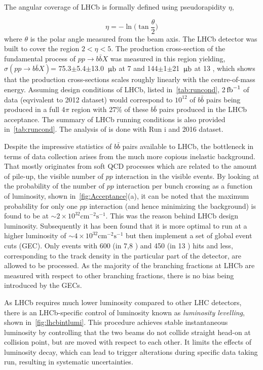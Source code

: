 The angular coverage of \Gls{LHCb} is formally defined using pseudorapidity $\eta$, 

\begin{equation}
	\eta = -\ln \Big(\tan\frac{\theta}{2}\Big)
\end{equation}	
where $\theta$ is the polar angle measured from the beam axis. The \Gls{LHCb} detector was built to cover the region $2<\eta<5$. The production cross-section of the fundamental process of $pp\rightarrow b\bar{b}X$ was measured in this region yielding, $\sigma (pp\rightarrow b\bar{b}X)$= 75.3$\pm$5.4$\pm$13.0 ${\rm \,\upmu b}$ at 7 \tev \cite{LHCb-PAPER-2010-002} and 144$\pm$1$\pm$21 ${\rm \,\upmu b}$ at 13 \tev \cite{LHCb-PAPER-2016-031}, which shows that the production cross-sections scales roughly linearly with the centre-of-mass energy. Assuming design conditions of \gls{LHCb}, listed in~\autoref{tab:runcond}, 2$\mbox{\,fb}^{-1}$ of data (eqvivalent to 2012 dataset) would correspond to $10^{12}$ of $b\bar{b}$ pairs being produced in a full 4$\pi$ region with 27\% of these $b\bar{b}$ pairs produced in the \gls{LHCb} acceptance. The summary of \gls{LHCb} running conditions is also provided in~\autoref{tab:runcond}. The analysis of \Bmumumu is done with Run \Rn{1} and 2016 dataset. 

Despite the impressive statistics of $b\bar{b}$ pairs available to \Gls{LHCb}, the bottleneck in terms of data collection arises from the much more copious inelastic background. That mostly originates from soft \gls{QCD} processes which are related to the amount of pile-up, the visible number of $pp$ interaction in the visible events. By looking at the probability of the number of $pp$ interaction per bunch crossing as a function of luminosity, shown in~\autoref{fig:Acceptance}(a), it can be noted that the maximum probability for only one $pp$ interaction (and hence minimizing the background) is found to be at $\sim 2 \times10^{32} \mathrm{cm^{-2} s^{-1}}$.  This was the reason behind \gls{LHCb} design luminosity. Subsequently it has been found that it is more optimal to run at a higher luminosity of $\sim 4 \times10^{32} \mathrm{cm^{-2} s^{-1}}$ but then implement a set of global event cuts (GEC). Only events with 600 (in 7,8 \tev) and 450 (in 13 \tev) hits and less, corresponding to the track density in the particular part of the detector, are allowed to be processed.
As the majority of the branching fractions at \gls{LHCb} are measured with respect to other branching fractions, there is no bias being introduced by the GECs. 

As \Gls{LHCb} requires much lower luminosity compared to other \gls{LHC} detectors, there is an LHCb-specific control of luminosity known as \textit{luminosity levelling}, shown in~\autoref{fig:lhcbintlumi}. This procedure achieves stable instantaneous luminosity by controlling that the two beams do not collide straight head-on at collision point, but are moved with respect to each other. It limits the effects of luminosity decay, which can lead to trigger alterations during specific data taking run, resulting in systematic uncertainties.



